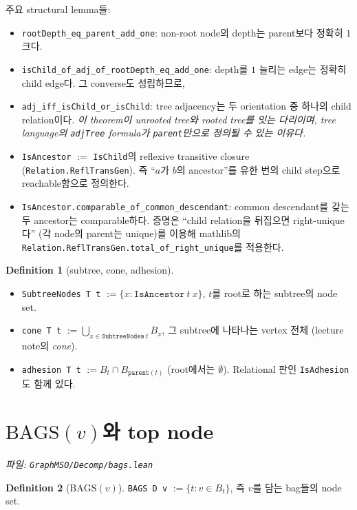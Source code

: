 \documentclass[11pt]{article}
\theoremstyle{definition}
\newtheorem{definition}{Definition}[section]
\theoremstyle{plain}
\newcommand{\lean}[1]{\texttt{#1}}
\newcommand{\leanfile}[1]{\texttt{#1}}
\begin{document}
주요 structural lemma들:
\begin{itemize}
  \item \lean{rootDepth\_eq\_parent\_add\_one}: non-root node의 depth는
    parent보다 정확히 $1$ 크다.
  \item \lean{isChild\_of\_adj\_of\_rootDepth\_eq\_add\_one}: depth를 $1$
    늘리는 edge는 정확히 child edge다. 그 converse도 성립하므로,
  \item \lean{adj\_iff\_isChild\_or\_isChild}: tree adjacency는 두 orientation
    중 하나의 child relation이다. \emph{이 theorem이 unrooted tree와 rooted
    tree를 잇는 다리이며, tree language의 \lean{adjTree} formula가
    \lean{parent}만으로 정의될 수 있는 이유다.}
  \item \lean{IsAncestor} $:=$ \lean{IsChild}의 reflexive transitive closure
    (\lean{Relation.ReflTransGen}). 즉 ``$a$가 $b$의 ancestor''를 유한 번의
    child step으로 reachable함으로 정의한다.
  \item \lean{IsAncestor.comparable\_of\_common\_descendant}: common descendant를
    갖는 두 ancestor는 comparable하다. 증명은 ``child relation을 뒤집으면
    right-unique다'' (각 node의 parent는 unique)를 이용해 mathlib의
    \lean{Relation.ReflTransGen.total\_of\_right\_unique}를 적용한다.
\end{itemize}

\begin{definition}[subtree, cone, adhesion]
\label{basics:def:cone}
\begin{itemize}
  \item \lean{SubtreeNodes T t} $:= \{x : \lean{IsAncestor}\ t\ x\}$, $t$를
    root로 하는 subtree의 node set.
  \item \lean{cone T t} $:= \bigcup_{x \in \lean{SubtreeNodes}\ t} B_x$,
    그 subtree에 나타나는 vertex 전체 (lecture note의 \emph{cone}).
  \item \lean{adhesion T t} $:= B_t \cap B_{\lean{parent}(t)}$
    (root에서는 $\emptyset$). Relational 판인 \lean{IsAdhesion}도 함께 있다.
\end{itemize}
\end{definition}

\section{\texorpdfstring{$\mathrm{BAGS}(v)$}{BAGS(v)}와 top node}
\label{basics:sec:bags}

\emph{파일: \leanfile{GraphMSO/Decomp/bags.lean}}

\begin{definition}[$\mathrm{BAGS}(v)$]
\label{basics:def:bags}
\lean{BAGS D v} $:= \{t : v \in B_t\}$, 즉 $v$를 담는 bag들의 node set.
\end{definition}
\end{document}
